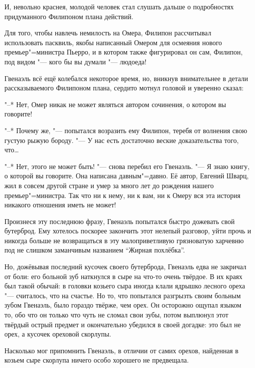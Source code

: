 И, невольно краснея, молодой человек стал слушать дальше о подробностях
придуманного Филипоном плана действий.

Для того, чтобы навлечь немилость на Омера, Филипон рассчитывал использовать
пасквиль, якобы написанный Омером для осмеяния нового премьер"=министра Пьерро,
и в котором также фигурировал он сам, Филипон, под видом "--- кого бы вы думали
"--- людоеда!

Гвенаэль всё ещё колебался некоторое время, но, вникнув внимательнее в детали
рассказываемого Филипоном плана, сердито мотнул головой и уверенно сказал:

"--* Нет, Омер никак не может являться автором сочинения, о котором вы говорите!

"--* Почему же, "--- попытался возразить ему Филипон, теребя от волнения свою
густую рыжую бороду.
"--- У нас есть достаточно веские доказательства того, что\ldots

"--* Нет, этого не может быть! "--- снова перебил его Гвенаэль.
"--- Я знаю книгу, о которой вы говорите.
Она написана давным"=давно.
Её автор, Евгений Шварц, жил в совсем другой стране и умер за много лет до
рождения нашего премьер"=министра.
Так что ни к нему, ни к вам, ни к Омеру вся эта история никакого отношения иметь
не может!

Произнеся эту последнюю фразу, Гвенаэль попытался быстро дожевать свой бутерброд.
Ему хотелось поскорее закончить этот нелепый разговор, уйти прочь и никогда
больше не возвращаться в эту малоприветливую грязноватую харчевню под не слишком
заманчивым названием \enquote{Жирная похлёбка}.

Но, дожёвывая последний кусочек своего бутерброда, Гвенаэль едва не закричал от
боли: его больной зуб наткнулся в сыре на что-то очень твёрдое.
В их краях был такой обычай: в головки козьего сыра иногда клали ядрышко лесного
ореха "--- считалось, что на счастье.
Но то, что попытался разгрызть своим больным зубом Гвенаэль, было гораздо
твёрже, чем орех.
Он осторожно ощупал языком то, обо что он только что чуть не сломал свои зубы,
потом выплюнул этот твёрдый острый предмет и окончательно убедился в своей
догадке: это был не орех, а кусочек ореховой скорлупы.

Насколько мог припомнить Гвенаэль, в отличии от самих орехов, найденная в козьем
сыре скорлупа ничего особо хорошего не предвещала.
